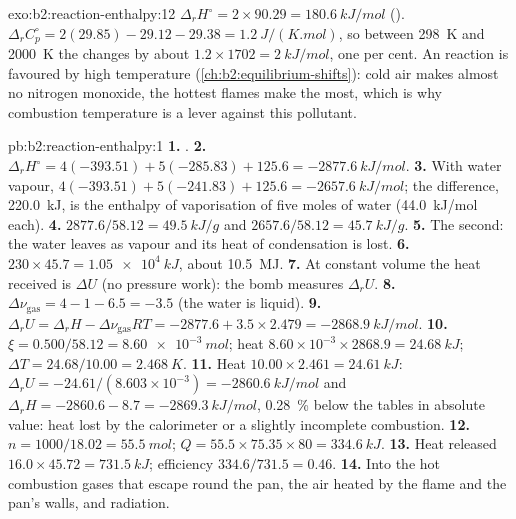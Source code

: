 \begin{solution}{exo:b2:reaction-enthalpy:12}
$\Delta_r H^\circ = 2 \times 90.29 = \qty{+180.6}{kJ/mol}$ ().
$\Delta_r C_p^\circ = 2(29.85) - 29.12 - 29.38 = \qty{1.2}{J/(K.mol)}$, so
between \qty{298}{K} and \qty{2000}{K} the  changes by
about $1.2 \times 1702 = \qty{2}{kJ/mol}$, one per cent. An 
reaction is favoured by high temperature (\cref{ch:b2:equilibrium-shifts}):
cold air makes almost no nitrogen monoxide, the hottest flames make the
most, which is why combustion temperature is a lever against this
pollutant.
\end{solution}

\begin{solution}{pb:b2:reaction-enthalpy:1}
\textbf{1.} .
\textbf{2.} $\Delta_r H^\circ = 4(-393.51) + 5(-285.83) + 125.6 =
\qty{-2877.6}{kJ/mol}$.
\textbf{3.} With water vapour, $4(-393.51) + 5(-241.83) + 125.6 =
\qty{-2657.6}{kJ/mol}$; the difference, \qty{220.0}{kJ}, is the enthalpy of
vaporisation of five moles of water (\qty{44.0}{kJ/mol} each).
\textbf{4.} $2877.6/58.12 = \qty{49.5}{kJ/g}$ and $2657.6/58.12 =
\qty{45.7}{kJ/g}$.
\textbf{5.} The second: the water leaves as vapour and its heat of
condensation is lost.
\textbf{6.} $230 \times 45.7 = \qty{1.05e4}{kJ}$, about \qty{10.5}{MJ}.
\textbf{7.} At constant volume the heat received is $\Delta U$ (no
pressure work): the bomb measures $\Delta_r U$.
\textbf{8.} $\Delta\nu_{\text{gas}} = 4 - 1 - 6.5 = -3.5$ (the water is
liquid).
\textbf{9.} $\Delta_r U = \Delta_r H - \Delta\nu_{\text{gas}}RT = -2877.6 +
3.5 \times 2.479 = \qty{-2868.9}{kJ/mol}$.
\textbf{10.} $\xi = 0.500/58.12 = \qty{8.60e-3}{mol}$; heat $8.60 \times
10^{-3} \times 2868.9 = \qty{24.68}{kJ}$; $\Delta T = 24.68/10.00 =
\qty{2.468}{K}$.
\textbf{11.} Heat $10.00 \times 2.461 = \qty{24.61}{kJ}$: $\Delta_r U =
-24.61/(8.603 \times 10^{-3}) = \qty{-2860.6}{kJ/mol}$ and $\Delta_r H =
-2860.6 - 8.7 = \qty{-2869.3}{kJ/mol}$, \qty{0.28}{\percent} below the
tables in absolute value: heat lost by the calorimeter or a slightly
incomplete combustion.
\textbf{12.} $n = 1000/18.02 = \qty{55.5}{mol}$; $Q = 55.5 \times 75.35
\times 80 = \qty{334.6}{kJ}$.
\textbf{13.} Heat released $16.0 \times 45.72 = \qty{731.5}{kJ}$; efficiency
$334.6/731.5 = 0.46$.
\textbf{14.} Into the hot combustion gases that escape round the pan, the
air heated by the flame and the pan's walls, and radiation.

\end{solution}
